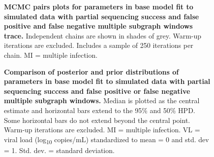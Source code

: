 \documentclass[10pt,letterpaper]{article}
\begin{document}
\begin{figure}[!ht]
\caption{{\bf MCMC pairs plots for parameters in base model fit to simulated data with partial sequencing success and false positive and false negative multiple subgraph windows trace.} Independent chains are shown in shades of grey. Warm-up iterations are excluded. Includes a sample of 250 iterations per chain. MI = multiple infection.}
\end{figure}

\begin{figure}[!ht]
\caption{{\bf Comparison of posterior and prior distributions of parameters in base model fit to simulated data with partial sequencing success and false positive or false negative multiple subgraph windows.} Median is plotted as the central estimate and horizontal bars extend to the 95\% and 50\% HPD. Some horizontal bars do not extend beyond the central point. Warm-up iterations are excluded. MI = multiple infection. VL = viral load (log\textsubscript{10} copies/mL) standardized to mean = 0 and std. dev = 1. Std. dev. = standard deviation. }
\end{figure}
\end{document}
